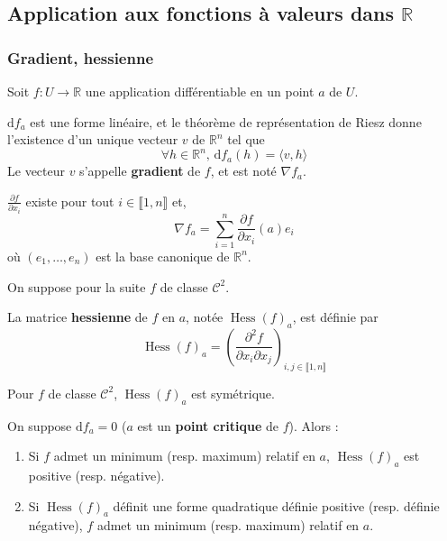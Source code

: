 	\subsection{Application aux fonctions à valeurs dans \texorpdfstring{$\mathbb{R}$}{R}}
	
	\subsubsection{Gradient, hessienne}
	
	
	Soit $f : U \rightarrow \mathbb{R}$ une application différentiable en un point $a$ de $U$.
	
	\begin{definition}
		$\mathrm{d}f_a$ est une forme linéaire, et le théorème de représentation de Riesz donne l'existence d'un unique vecteur $v$ de $\mathbb{R}^n$ tel que
		\[ \forall h \in \mathbb{R}^n, \, \mathrm{d}f_a(h) = \langle v, h \rangle \]
		Le vecteur $v$ s'appelle \textbf{gradient} de $f$, et est noté $\nabla f_a$.
	\end{definition}
	
	\begin{proposition}
		$\frac{\partial f}{\partial x_i}$ existe pour tout $i \in \llbracket 1, n \rrbracket$ et,
		\[ \nabla f_a = \sum_{i=1}^n \frac{\partial f}{\partial x_i}(a) e_i \]
		où $(e_1, \dots, e_n)$ est la base canonique de $\mathbb{R}^n$.
	\end{proposition}
	
	
	On suppose pour la suite $f$ de classe $\mathcal{C}^2$.
	
	\begin{definition}
		La matrice \textbf{hessienne} de $f$ en $a$, notée $\operatorname{Hess}(f)_a$, est définie par
		\[ \operatorname{Hess}(f)_a = \left( \frac{\partial^2 f}{\partial x_i \partial x_j} \right)_{i,j \in \llbracket 1, n \rrbracket} \]
	\end{definition}
	
	\begin{remark}
		Pour $f$ de classe $\mathcal{C}^2$, $\operatorname{Hess}(f)_a$ est symétrique.
	\end{remark}
	
	\begin{theorem}
		On suppose $\mathrm{d}f_a = 0$ ($a$ est un \textbf{point critique} de $f$). Alors :
		\begin{enumerate}[label=(\roman*)]
			\item Si $f$ admet un minimum (resp. maximum) relatif en $a$, $\operatorname{Hess}(f)_a$ est positive (resp. négative).
			\item Si $\operatorname{Hess}(f)_a$ définit une forme quadratique définie positive (resp. définie négative), $f$ admet un minimum (resp. maximum) relatif en $a$.
		\end{enumerate}
	\end{theorem}
	
